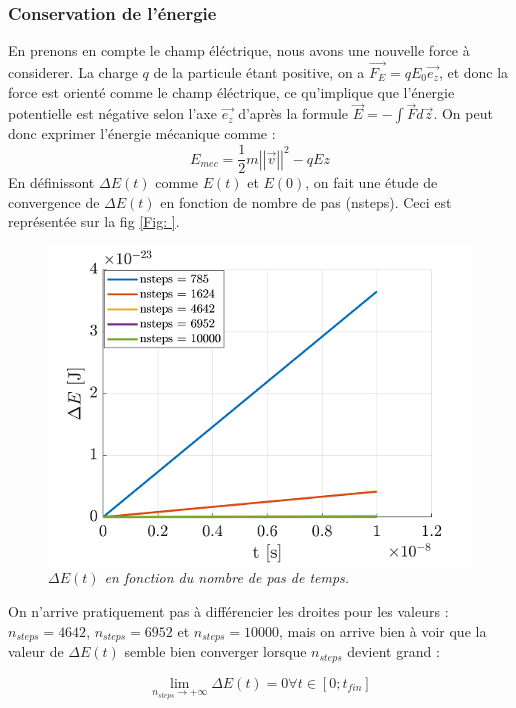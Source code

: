 \documentclass[a4paper,12pt,twoside]{article}
\begin{document}
			
	\subsubsection{Conservation de l'\'energie}
	En prenons en compte le champ \'el\'ectrique, nous avons une nouvelle force \`a considerer. La charge $q$ de la particule \'etant positive, on a $\Vec{F_E} = qE_0\Vec{e_z}$, et donc la force est orient\'e comme le champ \'el\'ectrique, ce qu'implique que l'\'energie potentielle est n\'egative selon l'axe $\Vec{e_z}$ d'apr\`es la formule $\Vec{E} = -\int \Vec{F}d\Vec{z}$. On peut donc exprimer l'\'energie m\'ecanique comme : 
	\begin{equation}\label{e_m_b_ii}
	E_{mec} = \frac{1}{2}m\left|\left|\Vec{v}\right|\right|^2 - qEz
	\end{equation}
	En d\'efinissont $\Delta E(t)$ comme $E(t)$ et $E(0)$, on fait une \'etude de convergence de $\Delta E(t)$ en fonction de nombre de pas (nsteps). Ceci est repr\'esent\'ee sur la fig \ref{Fig: }.
	
	\begin{figure}[h]
					\centering
					\includegraphics[scale = 0.6]{ener_mec_cons.png}
					\caption{\em\label{Fig: Cons Emec} $\Delta E(t)$ en fonction du nombre de pas de temps.}
	\end{figure}
On n'arrive pratiquement pas \`a diff\'erencier les droites pour les valeurs : $n_{steps} = 4642$, $n_{steps} = 6952$ et $n_{steps} = 10000$, mais on arrive bien \`a voir que la valeur de $\Delta E(t)$ semble bien converger lorsque $n_{steps}$ devient grand :

\begin{equation}\label{cons_en}
\lim_{n_{steps} \rightarrow +\infty} \Delta E(t) = 0 \forall t \in [0;t_{fin}]
\end{equation}
\end{document}
